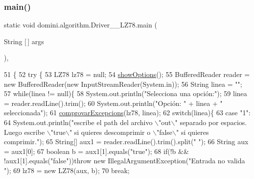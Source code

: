 \subsubsection{\texorpdfstring{main()}{main()}}
{\footnotesize\ttfamily static void domini.\+algorithm.\+Driver\+\_\+\+\_\+\+L\+Z78.\+main (\begin{DoxyParamCaption}\item[{String \mbox{[}$\,$\mbox{]}}]{args }\end{DoxyParamCaption})\hspace{0.3cm}{\ttfamily [inline]}, {\ttfamily [static]}}


\begin{DoxyCode}
51                                            \{
52     \textcolor{keywordflow}{try} \{
53         LZ78 lz78 = null;
54         \hyperlink{classdomini_1_1algorithm_1_1Driver____LZ78_af5e77bd40dbe6c3fa84ee5ee996b6dfe}{showOptions}();
55         BufferedReader reader = \textcolor{keyword}{new} BufferedReader(\textcolor{keyword}{new} InputStreamReader(System.in));
56         String linea = \textcolor{stringliteral}{""};
57         \textcolor{keywordflow}{while}(linea != null)\{
58             System.out.println(\textcolor{stringliteral}{"Selecciona una opción:"});
59             linea = reader.readLine().trim();
60             System.out.println(\textcolor{stringliteral}{"Opción: "} + linea + \textcolor{stringliteral}{" seleccionada"});
61             \hyperlink{classdomini_1_1algorithm_1_1Driver____LZ78_a21b185a3310ced322a1eb1b49f889f15}{comprovarExcepcions}(lz78, linea);
62             \textcolor{keywordflow}{switch}(linea)\{
63                 \textcolor{keywordflow}{case} \textcolor{stringliteral}{"1"}:
64                     System.out.println(\textcolor{stringliteral}{"escribe el path del archivo \(\backslash\)"out\(\backslash\)" separado por espacios. Luego
       escribe \(\backslash\)"true\(\backslash\)" si quieres descomprimir o \(\backslash\)"false\(\backslash\)" si quieres comprimir."});
65                     String[] aux1 = reader.readLine().trim().split(\textcolor{stringliteral}{" "});
66                     String aux = aux1[0];
67                     \textcolor{keywordtype}{boolean} b = aux1[1].equals(\textcolor{stringliteral}{"true"});
68                     \textcolor{keywordflow}{if}(!b && !aux1[1].equals(\textcolor{stringliteral}{"false"}))\textcolor{keywordflow}{throw} \textcolor{keyword}{new} IllegalArgumentException(\textcolor{stringliteral}{"Entrada no valida
      "});
69                     lz78 = \textcolor{keyword}{new} LZ78(aux, b);
70                 \textcolor{keywordflow}{break};

\end{DoxyCode}
